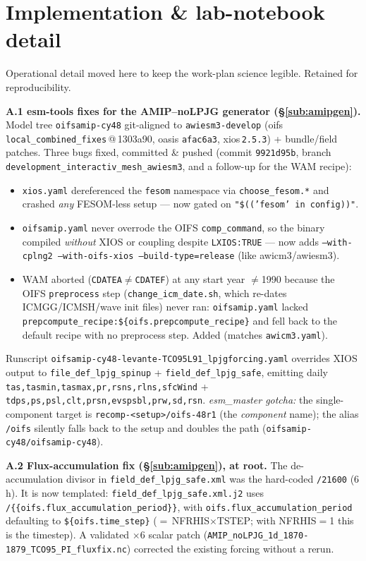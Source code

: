 \documentclass[10pt]{article}
\begin{document}
\section{Implementation \& lab-notebook detail}\label{app:impl}
Operational detail moved here to keep the work-plan science legible. Retained for reproducibility.

\textbf{A.1 esm-tools fixes for the AMIP--noLPJG generator (\S\ref{sub:amipgen}).} Model tree \texttt{oifsamip-cy48}
git-aligned to \texttt{awiesm3-develop} (oifs \texttt{local\_combined\_fixes}\,@\,1303a90, oasis \texttt{afac6a3},
xios\,\texttt{2.5.3}) + bundle/field patches. Three bugs fixed, committed \& pushed (commit \texttt{9921d95b}, branch
\texttt{development\_interactiv\_mesh\_awiesm3}, and a follow-up for the WAM recipe):
\begin{itemize}\itemsep0pt
\item \texttt{xios.yaml} dereferenced the \texttt{fesom} namespace via \texttt{choose\_fesom.*} and crashed \emph{any}
FESOM-less setup --- now gated on \texttt{"\$((\;'fesom' in config\;))"}.
\item \texttt{oifsamip.yaml} never overrode the OIFS \texttt{comp\_command}, so the binary compiled \emph{without} XIOS
or coupling despite \texttt{LXIOS:TRUE} --- now adds \texttt{--with-cplng2 --with-oifs-xios --build-type=release}
(like awicm3/awiesm3).
\item WAM aborted (\texttt{CDATEA}$\neq$\texttt{CDATEF}) at any start year $\neq$1990 because the OIFS
\texttt{preprocess} step (\texttt{change\_icm\_date.sh}, which re-dates ICMGG/ICMSH/wave init files) never ran:
\texttt{oifsamip.yaml} lacked \texttt{prepcompute\_recipe:\;\$\{oifs.prepcompute\_recipe\}} and fell back to the
default recipe with no preprocess step. Added (matches \texttt{awicm3.yaml}).
\end{itemize}
Runscript \texttt{oifsamip-cy48-levante-TCO95L91\_lpjgforcing.yaml} overrides XIOS output to
\texttt{file\_def\_lpjg\_spinup} + \texttt{field\_def\_lpjg\_safe}, emitting daily
\texttt{tas,tasmin,tasmax,pr,rsns,rlns,sfcWind} + \texttt{tdps,ps,psl,clt,prsn,evspsbl,prw,sd,rsn}.
\emph{esm\_master gotcha:} the single-component target is \texttt{recomp-<setup>/oifs-48r1} (the \emph{component}
name); the alias \texttt{/oifs} silently falls back to the setup and doubles the path
(\texttt{oifsamip-cy48/oifsamip-cy48}).

\textbf{A.2 Flux-accumulation fix (\S\ref{sub:amipgen}), at root.} The de-accumulation divisor in
\texttt{field\_def\_lpjg\_safe.xml} was the hard-coded \texttt{/21600} (6\,h). It is now templated:
\texttt{field\_def\_lpjg\_safe.xml.j2} uses \texttt{/\{\{oifs.flux\_accumulation\_period\}\}}, with
\texttt{oifs.flux\_accumulation\_period} defaulting to \texttt{\$\{oifs.time\_step\}} ($=$\,NFRHIS$\times$TSTEP; with
NFRHIS$=$1 this is the timestep). A validated $\times6$ scalar patch
(\texttt{AMIP\_noLPJG\_1d\_1870-1879\_TCO95\_PI\_fluxfix.nc}) corrected the existing forcing without a rerun.
\end{document}
